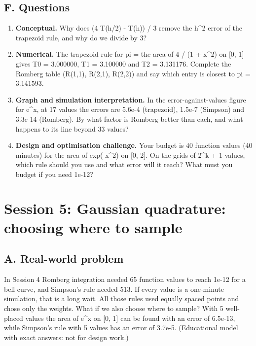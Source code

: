 \documentclass[11pt,a4paper]{article}
\begin{document}
\subsection*{F. Questions}
\begin{enumerate}[nosep]
\item \textbf{Conceptual.} Why does (4 T(h/2) - T(h)) / 3 remove the h\textasciicircum{}2 error of the trapezoid rule, and why do we divide by 3?
\item \textbf{Numerical.} The trapezoid rule for pi = the area of 4 / (1 + x\textasciicircum{}2) on [0, 1] gives T0 = 3.000000, T1 = 3.100000 and T2 = 3.131176. Complete the Romberg table (R(1,1), R(2,1), R(2,2)) and say which entry is closest to pi = 3.141593.
\item \textbf{Graph and simulation interpretation.} In the error-against-values figure for e\textasciicircum{}x, at 17 values the errors are 5.6e-4 (trapezoid), 1.5e-7 (Simpson) and 3.3e-14 (Romberg). By what factor is Romberg better than each, and what happens to its line beyond 33 values?
\item \textbf{Design and optimisation challenge.} Your budget is 40 function values (40 minutes) for the area of exp(-x\textasciicircum{}2) on [0, 2]. On the grids of 2\textasciicircum{}k + 1 values, which rule should you use and what error will it reach? What must you budget if you need 1e-12?
\end{enumerate}

\section{Session 5: Gaussian quadrature: choosing where to sample}

\subsection*{A. Real-world problem}
In Session 4 Romberg integration needed 65 function values to reach 1e-12 for a bell curve, and Simpson's rule needed 513. If every value is a one-minute simulation, that is a long wait. All those rules used equally spaced points and chose only the weights. What if we also choose where to sample? With 5 well-placed values the area of e\textasciicircum{}x on [0, 1] can be found with an error of 6.5e-13, while Simpson's rule with 5 values has an error of 3.7e-5. (Educational model with exact answers: not for design work.)
\end{document}
